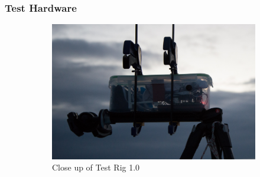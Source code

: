 \subsubsection{\label{sec:discussion:equipment:hardware}Test Hardware}

\begin{figure}[h]
\centering
\begin{subfigure}{.65\textwidth}
  \centering
  \includegraphics[width=.95\linewidth]{"./image/20150219-_BEN2653"}
  \caption{Close up of Test Rig 1.0}
  \label{fig:test_rig_1.0_tofino:sub1}
\end{subfigure}%
\begin{subfigure}{.35\textwidth}
  \centering

\end{subfigure}
\end{figure}
